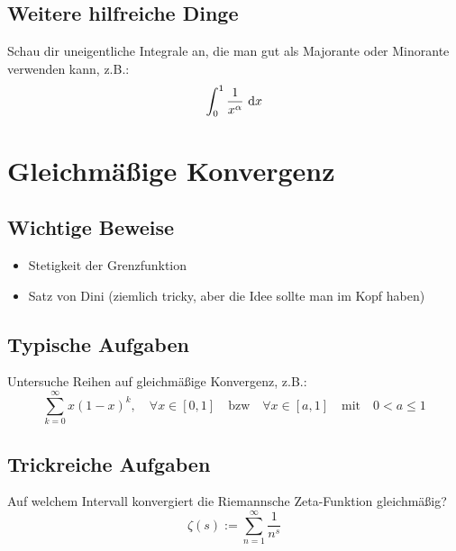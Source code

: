 \subsection{Weitere hilfreiche Dinge}
Schau dir uneigentliche Integrale an, die man gut als Majorante oder Minorante
verwenden kann, z.B.:
\begin{equation*}
    \int_0^1 \frac{1}{x^\alpha}\text{ d}x
\end{equation*}

\section{Gleichmäßige Konvergenz}
\subsection{Wichtige Beweise}
\begin{itemize}
  \item Stetigkeit der Grenzfunktion
  \item Satz von Dini (ziemlich tricky, aber die Idee sollte man im Kopf haben)
\end{itemize}

\subsection{Typische Aufgaben}
Untersuche Reihen auf gleichmäßige Konvergenz, z.B.:
\begin{equation*}
    \sum_{k=0}^\infty x(1-x)^k,\quad \forall x \in [0,1] \quad \text{bzw} \quad \forall x \in [a,1] \quad \text{mit} \quad 0 < a \leq 1
\end{equation*}

\subsection{Trickreiche Aufgaben}
Auf welchem Intervall konvergiert die Riemannsche Zeta-Funktion gleichmäßig?
\begin{equation*}
    \zeta(s):=\sum_{n=1}^\infty \frac{1}{n^s}
\end{equation*}
